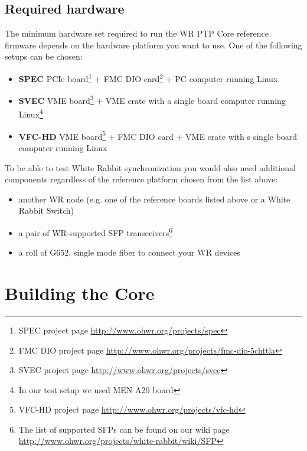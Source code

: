 \documentclass[a4paper, 12pt]{article}
\begin{document}
\subsection{Required hardware}
\label{Required hardware}

The minimum hardware set required to run the WR PTP Core reference firmware
depends on the hardware platform you want to use. One of the following setups
can be chosen:
\begin{itemize}
  \item {\bf SPEC} PCIe board\footnote{SPEC project page
    \url{http://www.ohwr.org/projects/spec}} + FMC DIO
    card\footnote{\label{note_dio}FMC DIO project page
    \url{http://www.ohwr.org/projects/fmc-dio-5chttla}} + PC computer running
    Linux

  \item  {\bf SVEC} VME board\footnote{SVEC project page
    \url{http://www.ohwr.org/projects/svec}} + VME crate with a single board
    computer running Linux\footnote{\label{note_a20}In our test setup we used MEN A20 board}

  \item {\bf VFC-HD} VME board\footnote{VFC-HD project page
    \url{http://www.ohwr.org/projects/vfc-hd}} + FMC DIO card
    + VME crate with s single board computer running Linux

\end{itemize}

To be able to test White Rabbit synchronization you would also need
additional components regardless of the reference platform chosen from the list
above:
\begin{itemize}
  \item another WR node (e.g. one of the reference boards listed above or a
    White Rabbit Switch)
  \item a pair of WR-supported SFP transceivers\footnote{The list of supported
    SFPs can be found on our wiki page
    \url{http://www.ohwr.org/projects/white-rabbit/wiki/SFP}}
  \item a roll of G652, single mode fiber to connect your WR devices
\end{itemize}

\newpage
\section{Building the Core}
\label{Building the Core}
\end{document}
